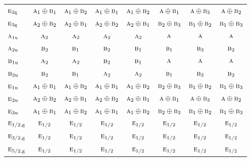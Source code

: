 \documentclass[10pt,a4paper]{article}
\numberwithin{equation}{section}
\newcommand{\irr}[1]{\text{\normalfont\scshape #1}}
\newcommand{\ptag}[1]{\mathrm{#1}}
\begin{document}
{\begin{longtable}{@{}lccccccc@{}}
$\irr{e}_{2\ptag{g}}$ & $\irr{a}_{1}\oplus \irr{b}_{1}$ & $\irr{a}_{1}\oplus \irr{b}_{2}$ & $\irr{a}_{1}\oplus \irr{b}_{1}$ & $\irr{a}_{1}\oplus \irr{b}_{2}$ & $\irr{a}\oplus \irr{b}_{1}$ & $\irr{a}\oplus \irr{b}_{3}$ & $\irr{a}\oplus \irr{b}_{2}$\\
$\irr{e}_{3\ptag{g}}$ & $\irr{a}_{2}\oplus \irr{b}_{2}$ & $\irr{a}_{2}\oplus \irr{b}_{1}$ & $\irr{a}_{2}\oplus \irr{b}_{2}$ & $\irr{a}_{2}\oplus \irr{b}_{1}$ & $\irr{b}_{2}\oplus \irr{b}_{3}$ & $\irr{b}_{1}\oplus \irr{b}_{2}$ & $\irr{b}_{1}\oplus \irr{b}_{3}$\\
$\irr{a}_{1\ptag{u}}$ & $\irr{a}_{2}$ & $\irr{a}_{2}$ & $\irr{a}_{2}$ & $\irr{a}_{2}$ & $\irr{a}$ & $\irr{a}$ & $\irr{a}$\\
$\irr{a}_{2\ptag{u}}$ & $\irr{b}_{2}$ & $\irr{b}_{1}$ & $\irr{b}_{2}$ & $\irr{b}_{1}$ & $\irr{b}_{1}$ & $\irr{b}_{3}$ & $\irr{b}_{2}$\\
$\irr{b}_{1\ptag{u}}$ & $\irr{a}_{2}$ & $\irr{a}_{2}$ & $\irr{b}_{2}$ & $\irr{b}_{1}$ & $\irr{a}$ & $\irr{a}$ & $\irr{a}$\\
$\irr{b}_{2\ptag{u}}$ & $\irr{b}_{2}$ & $\irr{b}_{1}$ & $\irr{a}_{2}$ & $\irr{a}_{2}$ & $\irr{b}_{1}$ & $\irr{b}_{3}$ & $\irr{b}_{2}$\\
$\irr{e}_{1\ptag{u}}$ & $\irr{a}_{1}\oplus \irr{b}_{1}$ & $\irr{a}_{1}\oplus \irr{b}_{2}$ & $\irr{a}_{1}\oplus \irr{b}_{1}$ & $\irr{a}_{1}\oplus \irr{b}_{2}$ & $\irr{b}_{2}\oplus \irr{b}_{3}$ & $\irr{b}_{1}\oplus \irr{b}_{2}$ & $\irr{b}_{1}\oplus \irr{b}_{3}$\\
$\irr{e}_{2\ptag{u}}$ & $\irr{a}_{2}\oplus \irr{b}_{2}$ & $\irr{a}_{2}\oplus \irr{b}_{1}$ & $\irr{a}_{2}\oplus \irr{b}_{2}$ & $\irr{a}_{2}\oplus \irr{b}_{1}$ & $\irr{a}\oplus \irr{b}_{1}$ & $\irr{a}\oplus \irr{b}_{3}$ & $\irr{a}\oplus \irr{b}_{2}$\\
$\irr{e}_{3\ptag{u}}$ & $\irr{a}_{1}\oplus \irr{b}_{1}$ & $\irr{a}_{1}\oplus \irr{b}_{2}$ & $\irr{a}_{1}\oplus \irr{b}_{1}$ & $\irr{a}_{1}\oplus \irr{b}_{2}$ & $\irr{b}_{2}\oplus \irr{b}_{3}$ & $\irr{b}_{1}\oplus \irr{b}_{2}$ & $\irr{b}_{1}\oplus \irr{b}_{3}$\\
$\irr{e}_{1/2,\ptag{g}}$ & $\irr{e}_{1/2}$ & $\irr{e}_{1/2}$ & $\irr{e}_{1/2}$ & $\irr{e}_{1/2}$ & $\irr{e}_{1/2}$ & $\irr{e}_{1/2}$ & $\irr{e}_{1/2}$\\
$\irr{e}_{3/2,\ptag{g}}$ & $\irr{e}_{1/2}$ & $\irr{e}_{1/2}$ & $\irr{e}_{1/2}$ & $\irr{e}_{1/2}$ & $\irr{e}_{1/2}$ & $\irr{e}_{1/2}$ & $\irr{e}_{1/2}$\\
$\irr{e}_{5/2,\ptag{g}}$ & $\irr{e}_{1/2}$ & $\irr{e}_{1/2}$ & $\irr{e}_{1/2}$ & $\irr{e}_{1/2}$ & $\irr{e}_{1/2}$ & $\irr{e}_{1/2}$ & $\irr{e}_{1/2}$\\

\end{longtable}}
\end{document}
